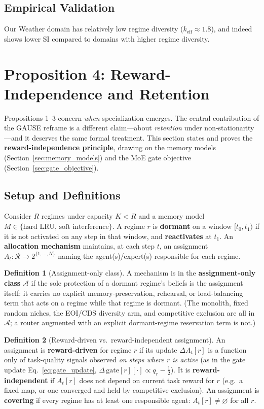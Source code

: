 \documentclass[11pt,a4paper]{article}
\theoremstyle{definition}
\newtheorem{definition}{Definition}[section]
\theoremstyle{plain}
\begin{document}
\subsection{Empirical Validation}

Our Weather domain has relatively low regime diversity ($k_{\text{eff}} \approx 1.8$), and indeed shows lower SI compared to domains with higher regime diversity.

\section{Proposition 4: Reward-Independence and Retention}
\label{sec:reward_independence_prop}

Propositions 1--3 concern \emph{when} specialization emerges. The central
contribution of the GAUSE reframe is a different claim---about \emph{retention}
under non-stationarity---and it deserves the same formal treatment. This section
states and proves the \textbf{reward-independence principle}, drawing on the
memory models (Section~\ref{sec:memory_models}) and the MoE gate objective
(Section~\ref{sec:gate_objective}).

\subsection{Setup and Definitions}

Consider $R$ regimes under capacity $K < R$ and a memory model
$M \in \{\text{hard LRU},\,\text{soft interference}\}$. A regime $r$ is
\textbf{dormant} on a window $[t_0, t_1)$ if it is not activated on any step in
that window, and \textbf{reactivates} at $t_1$. An \textbf{allocation mechanism}
maintains, at each step $t$, an assignment $A_t : \mathcal{R} \to 2^{\{1,\ldots,N\}}$
naming the agent(s)/expert(s) responsible for each regime.

\begin{definition}[Assignment-only class]
A mechanism is in the \textbf{assignment-only class} $\mathcal{A}$ if the sole
protection of a dormant regime's beliefs is the assignment itself: it carries no
explicit memory-preservation, rehearsal, or load-balancing term that acts on a
regime while that regime is dormant. (The monolith, fixed random niches, the
EOI/CDS diversity arm, and competitive exclusion are all in $\mathcal{A}$; a
router augmented with an explicit dormant-regime reservation term is not.)
\end{definition}

\begin{definition}[Reward-driven vs.\ reward-independent assignment]
An assignment is \textbf{reward-driven} for regime $r$ if its update
$\Delta A_t[r]$ is a function only of task-quality signals observed \emph{on steps
where $r$ is active} (as in the gate update Eq.~\eqref{eq:gate_update},
$\Delta\,\mathrm{gate}[r][\cdot] \propto q_{r}-\tfrac12$). It is
\textbf{reward-independent} if $A_t[r]$ does not depend on current task reward for
$r$ (e.g.\ a fixed map, or one converged and held by competitive exclusion).
An assignment is \textbf{covering} if every regime has at least one responsible
agent: $A_t[r] \neq \varnothing$ for all $r$.
\end{definition}
\end{document}
